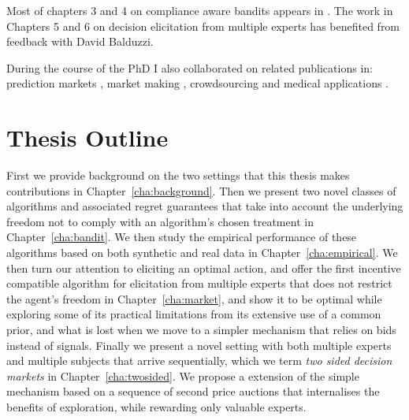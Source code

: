Most of chapters 3 and 4 on compliance aware bandits appears in \cite{della2016compliance}. The work in Chapters 5 and 6 on decision elicitation from multiple experts has benefited from feedback with David Balduzzi.

During the course of the PhD I also collaborated on related publications in: prediction markets \cite{frongillo2012interpreting}, market making \cite{kinathil2014closed,kinathil2016symbolic}, crowdsourcing \cite{della2012crowd} and medical applications \cite{della2016out}.


\section{Thesis Outline}
\label{sec:outline}

First we provide background on the two settings that this thesis makes contributions in  Chapter~\ref{cha:background}. Then we present two novel classes of algorithms and associated regret guarantees that take into account the underlying freedom not to comply with an algorithm's chosen treatment in Chapter~\ref{cha:bandit}. We then study the empirical performance  of these algorithms based on both synthetic and real data in Chapter~\ref{cha:empirical}. 
We then turn our attention to eliciting an optimal action, and offer the first incentive compatible algorithm for elicitation from multiple experts that does not restrict the agent's freedom in Chapter~\ref{cha:market}, and show it to be optimal while exploring some of its practical limitations from its extensive use of a common prior, and what is lost when we move to a simpler mechanism that relies on bids instead of signals.
Finally we present a novel setting with both multiple experts and multiple subjects that arrive sequentially, which we term \emph{two sided decision markets} in Chapter~\ref{cha:twosided}. We propose a extension of the simple mechanism based on a sequence of second price auctions that internalises the benefits of exploration, while rewarding only valuable experts.

